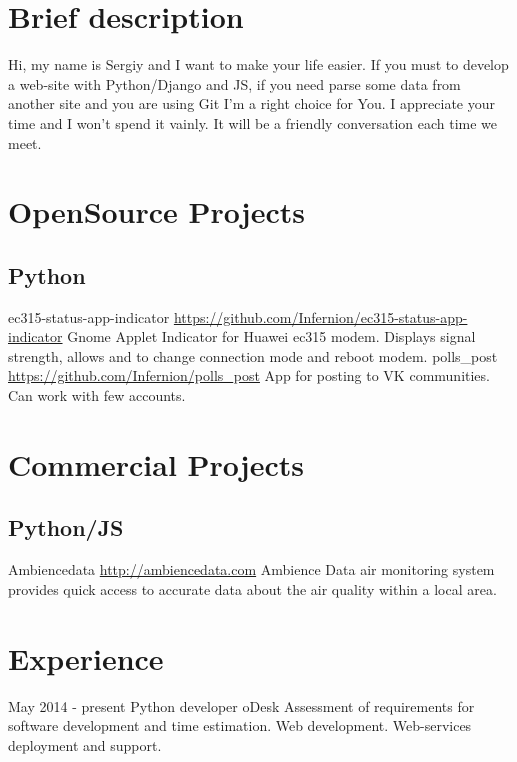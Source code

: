 \documentclass[11pt,a4paper]{moderncv}
\begin{document}
	\maketitle
	
	\section{Brief description}
	\cvline
	{}
	{Hi, my name is Sergiy and I want to make your life easier.\newline{}
	If you must to develop a web-site with Python/Django and JS, if you need parse some data from another site and you are using  Git I'm a right choice for You. \newline{}
	I appreciate your time and I won't spend it vainly.	It will be a friendly conversation each time we meet.}
	
	\section{OpenSource Projects}
	\subsection{Python}
	\cvline
	{ec315-status-app-indicator}
	{\url{https://github.com/Infernion/ec315-status-app-indicator}\newline{}
	Gnome Applet Indicator for Huawei ec315 modem. Displays signal strength, allows and to change connection mode and reboot modem.}
	\cvline
	{polls\_post}
	{\url{https://github.com/Infernion/polls_post}\newline{}
	App for posting to VK communities. Can work with few accounts.}
	
	
	\section{Commercial Projects}
	\subsection{Python/JS}
	\cvline
	{Ambiencedata}
	{\url{http://ambiencedata.com}\newline{}
		Ambience Data air monitoring system provides quick access to accurate data about the air quality within a local area.}
	
	\section{Experience}
	\cventry
	{May 2014 - present}
	{Python developer}
	{oDesk}
	{}{}
	{Assessment of requirements for software development and time estimation. 
		\newline{}Web development.
		\newline{}Web-services deployment and support.}
	
\end{document}
